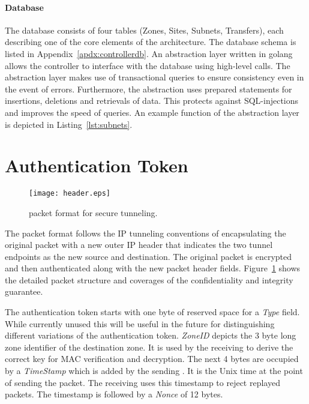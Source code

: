 \paragraph{Database}
The database consists of four tables (Zones, Sites, Subnets, Transfers), each describing one of
the core elements of the architecture.
The database schema is listed in Appendix~\ref{apdx:controllerdb}. An abstraction layer
written in golang allows the controller to interface with the database using high-level calls.
The abstraction layer makes use of transactional queries to ensure consistency even in the event
of errors. Furthermore, the abstraction uses prepared statements for insertions, deletions and
retrievals of data. This protects against SQL-injections and improves the speed of queries.
An example function of the abstraction layer is depicted in Listing~\ref{lst:subnets}.
	
\section{Authentication Token}
\label{sec:token}
	
\begin{figure}[htb]
	\begin{center}
		\texttt{[image: header.eps]}
	\end{center}
	\caption{\name packet format for secure tunneling.}
	\label{fig:header}
\end{figure}
	
The \name packet format follows the IP tunneling conventions of encapsulating the original
packet with a new outer IP header that indicates the two tunnel endpoints as the new source
and destination. The original packet is encrypted and then authenticated along with the new
packet header fields. Figure~\ref{fig:header} shows the detailed packet structure and coverages
of the confidentiality and integrity guarantee.
	
The authentication token starts with one byte of reserved space for a \textit{Type} field. While
currently unused this will be useful in the future for distinguishing different variations of
the authentication token. \textit{ZoneID} depicts the 3 byte long zone identifier of the
destination zone. It is used by the receiving \tp to derive the correct key for MAC verification
and decryption. The next 4 bytes are occupied by a \textit{TimeStamp} which is added by the
sending \tp. It is the Unix time at the point of sending the packet. The receiving \tp uses this
timestamp to reject replayed packets. The timestamp is followed by a \textit{Nonce} of 12 bytes.
	
